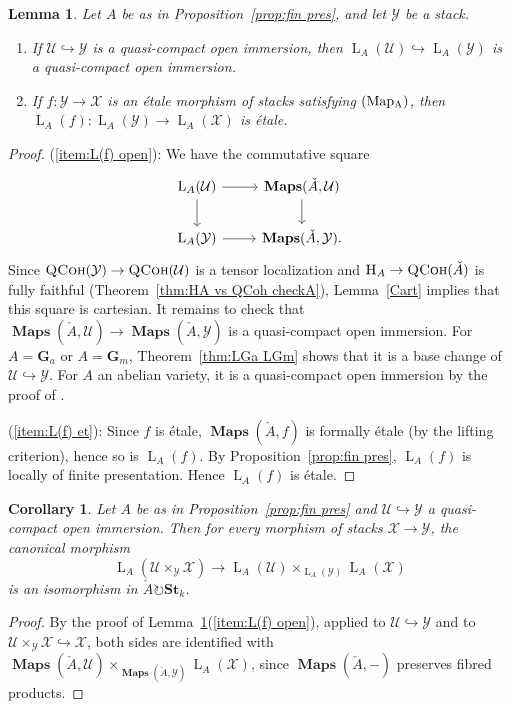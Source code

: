 \documentclass[12pt, oneside]{amsart}
\numberwithin{equation}{section}
\newtheorem{corollary}[subsubsection]{Corollary}
\newtheorem{lemma}[subsubsection]{Lemma}
\theoremstyle{remark}
\theoremstyle{plain}
\DeclareMathOperator{\QCoh}{\textsc{QCoh}}
\DeclareMathOperator{\MAP}{\mathbf{Maps}}
\newcommand{\Hcat}{\textup{\textsc{H}}}
\newcommand{\HA}{\Hcat_A}
\newcommand{\Loop}{\operatorname{L}}
\newcommand{\YY}{\mathcal{Y}}
\newcommand{\XX}{\mathcal{X}}
\newcommand{\GGa}{\mathbf{G}_{a}}
\newcommand{\GGm}{\mathbf{G}_{m}}
\newcommand{\Stk}{\mathbf{St}_{k}}
\newcommand{\UU}{\mathcal{U}}
\begin{document}
\begin{lemma}\label{lem:L(f) open/et}
Let $A$ be as in Proposition~\ref{prop:fin pres}, and let $\YY$ be a stack.
\begin{enumerate}
  \item\label{item:L(f) open} If $\mathcal{U}\hookrightarrow \YY$ is a quasi-compact open immersion, then $\Loop_A(\mathcal{U}) \hookrightarrow \Loop_A(\YY)$ is a quasi-compact open immersion.
  \item\label{item:L(f) et} If $f : \YY \to \XX$ is an étale morphism of stacks satisfying $(\textup{Map}\textsubscript{A})$, then $\Loop_A(f) : \Loop_A(\YY) \to \Loop_A(\XX)$ is étale.
\end{enumerate}
\end{lemma}
\begin{proof}
(\ref{item:L(f) open}):
We have the commutative square \[\begin{tikzcd}
\Loop_A(\mathcal{U}) \arrow{r} \arrow[swap]{d}& \MAP(\check{A}, \mathcal{U}) \arrow{d}\\
\Loop_A(\YY)\arrow{r} & \MAP(\check{A}, \YY).
\end{tikzcd}\]
Since $\QCoh(\YY)\rightarrow\QCoh(\mathcal{U})$ is a tensor localization and $\HA\rightarrow\QCoh(\check{A})$ is fully faithful (Theorem~\ref{thm:HA vs QCoh checkA}), Lemma~\ref{Cart} implies that this square is cartesian.
It remains to check that $\MAP(\check{A},\mathcal{U}) \to \MAP(\check{A}, \YY)$ is a quasi-compact open immersion.
For $A=\GGa$ or $A=\GGm$, Theorem~\ref{thm:LGa LGm} shows that it is a base change of $\UU \hookrightarrow \YY$.
For $A$ an abelian variety, it is a quasi-compact open immersion by the proof of \cite[Prop.~19.1.1.1]{SAG}.

(\ref{item:L(f) et}):
Since $f$ is étale, $\MAP(\check{A},f)$ is formally étale (by the lifting criterion), hence so is $\Loop_A(f)$.
By Proposition~\ref{prop:fin pres}, $\Loop_A(f)$ is locally of finite presentation.
Hence $\Loop_A(f)$ is étale.
\end{proof}

\begin{corollary}\label{cor:Kun open}
  Let $A$ be as in Proposition~\ref{prop:fin pres} and $\mathcal{U} \hookrightarrow \YY$ a quasi-compact open immersion.
  Then for every morphism of stacks $\XX \to \YY$, the canonical morphism
  $$ \Loop_A(\mathcal{U} \times_{\YY} \XX) \longrightarrow \Loop_A(\mathcal{U}) \times_{\Loop_A(\YY)} \Loop_A(\XX) $$
  is an isomorphism in $\check{A}\circlearrowright \Stk$.
\end{corollary}
\begin{proof}
  By the proof of Lemma~\ref{lem:L(f) open/et}(\ref{item:L(f) open}), applied to $\mathcal{U} \hookrightarrow \YY$ and to $\mathcal{U} \times_{\YY} \XX \hookrightarrow \XX$, both sides are identified with $\MAP(\check{A}, \mathcal{U}) \times_{\MAP(\check{A}, \YY)} \Loop_A(\XX)$, since $\MAP(\check{A}, -)$ preserves fibred products.
\end{proof}
\end{document}
